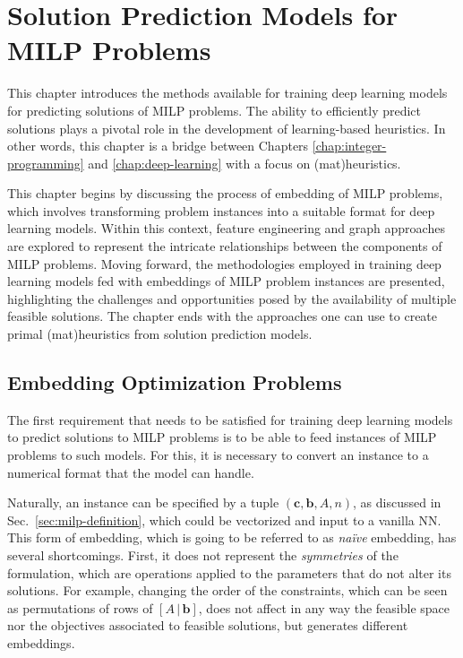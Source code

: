 

\chapter{Solution Prediction Models for MILP Problems}\label{chap:solution-prediction}


This chapter introduces the methods available for training deep learning models for predicting solutions of MILP problems.
The ability to efficiently predict solutions plays a pivotal role in the development of learning-based heuristics.
In other words, this chapter is a bridge between Chapters \ref{chap:integer-programming} and \ref{chap:deep-learning} with a focus on (mat)heuristics.

This chapter begins by discussing the process of embedding of MILP problems, which involves transforming problem instances into a suitable format for deep learning models.
Within this context, feature engineering and graph approaches are explored to represent the intricate relationships between the components of MILP problems.
Moving forward, the methodologies employed in training deep learning models fed with embeddings of MILP problem instances are presented, highlighting the challenges and opportunities posed by the availability of multiple feasible solutions.
The chapter ends with the approaches one can use to create primal (mat)heuristics from solution prediction models.


\section{Embedding Optimization Problems}


The first requirement that needs to be satisfied for training deep learning models to predict solutions to MILP problems is to be able to feed instances of MILP problems to such models.
For this, it is necessary to convert an instance to a numerical format that the model can handle.

Naturally, an instance can be specified by a tuple $\left( \bm{c}, \bm{b}, A, n \right)$, as discussed in Sec.~\ref{sec:milp-definition}, which could be vectorized and input to a vanilla NN.
This form of embedding, which is going to be referred to as \emph{naïve} embedding, has several shortcomings.
First, it does not represent the \emph{symmetries} of the formulation, which are operations applied to the parameters that do not alter its solutions.
For example, changing the order of the constraints, which can be seen as permutations of rows of $\left[ A\, | \,\bm{b} \right] $, does not affect in any way the feasible space nor the objectives associated to feasible solutions, but generates different embeddings.

